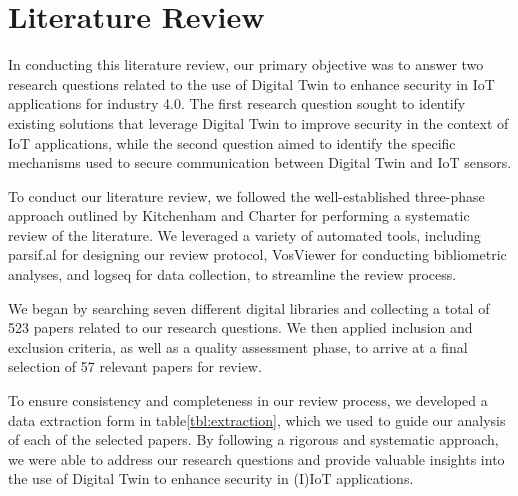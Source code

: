                 

\chapter{Literature Review} 
\label{Chapter3} %
In conducting this literature review, our primary objective was to answer two research questions related to the use of Digital Twin to enhance security in IoT applications for industry 4.0. The first research question sought to identify existing solutions that leverage Digital Twin to improve security in the context of IoT applications, while the second question aimed to identify the specific mechanisms used to secure communication between Digital Twin and IoT sensors.

To conduct our literature review, we followed the well-established three-phase approach outlined by Kitchenham and Charter for performing a systematic review of the literature. We leveraged a variety of automated tools, including parsif.al for designing our review protocol, VosViewer for conducting bibliometric analyses, and logseq for data collection, to streamline the review process.

We began by searching seven different digital libraries and collecting a total of 523 papers related to our research questions. We then applied inclusion and exclusion criteria, as well as a quality assessment phase, to arrive at a final selection of 57 relevant papers for review.

To ensure consistency and completeness in our review process, we developed a data extraction form in table\ref{tbl:extraction}, which we used to guide our analysis of each of the selected papers. By following a rigorous and systematic approach, we were able to address our research questions and provide valuable insights into the use of Digital Twin to enhance security in (I)IoT applications.

